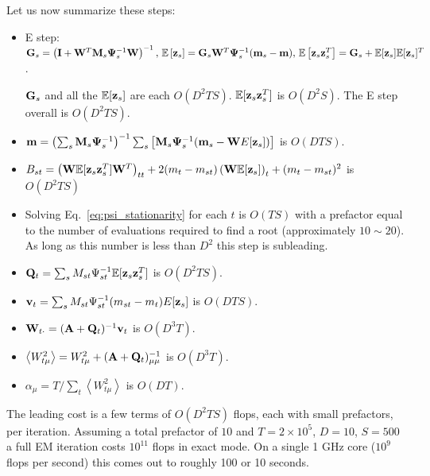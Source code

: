 \documentclass[nofootinbib,amssymb,amsmath]{revtex4}
\newcommand{\ave}[1]{\left\langle #1 \right\rangle}
\newcommand{\vI}{{\bf I}}
\newcommand{\vv}{{\bf v}}
\newcommand{\vz}{{\bf z}}
\newcommand{\vm}{{\bf m}}
\newcommand{\vG}{{\bf G}}
\newcommand{\vQ}{{\bf Q}}
\newcommand{\vM}{{\bf M}}
\newcommand{\vW}{{\bf W}}
\newcommand{\vPsi}{{\bf \Psi}}
\newcommand{\vA}{{\bf A}}
\newcommand{\EE}{\mathbb{E}}
\begin{document}
\noindent Let us now summarize these steps:
\begin{itemize}
\item E step: $\vG_s = \left( \vI + \vW^T \vM_s \vPsi_s^{-1} \vW \right)^{-1}, \,
\EE \left[ \vz_s \right] = \vG_s \vW^T \vPsi_s^{-1} (\vm_s - \vm), \,
\EE \left[ \vz_s \vz_s^T \right] = \vG_s + \EE[\vz_s] \EE[\vz_s]^T$.

$\vG_s$ and all the $\EE[\vz_s]$ are each $O(D^2 T S)$. $\EE[\vz_s \vz_s^T]$ is $O(D^2 S)$.  The E step overall is $O(D^2 T S)$.

\item $\vm = \left( \sum_s \vM_s \vPsi_{s}^{-1} \right)^{-1} \sum_s \left[ \vM_s \vPsi_{s}^{-1}  (\vm_{s}  - \vW  E[\vz_{s}] ) \right]$ is $O(D T S)$.

\item  $ B_{st} =\left( \vW \EE[\vz_s \vz_s^T] \vW^T \right)_{tt} +2 (m_t - m_{st}) \left( \vW \EE[\vz_s] \right)_t + (m_t - m_{st})^2$ is $O(D^2 T S)$

\item Solving Eq.~\eqref{eq:psi_stationarity} for each $t$ is $O(T S)$ with a prefactor equal to the number of evaluations required to find a root (approximately $10 \sim 20$). As long as this number is less than $D^2$ this step is subleading.

\item $\vQ_t = \sum_s M_{st} \Psi_{st}^{-1} \EE[\vz_s \vz_s^T]$ is $O(D^2 T S)$.

\item $\vv_t = \sum_s M_{st} \Psi_{st}^{-1} (m_{st} - m_t)E[\vz_s ]$ is $O(D T S)$.

\item $ \vW_{t \cdot} = (\vA + \vQ_t)^{-1} \vv_t$ is $O(D^3 T)$.

\item $\ave{W_{t\mu}^2} = W_{t\mu}^2 + (\vA + \vQ_t)^{-1}_{\mu\mu}$ is $O(D^3 T)$.

\item $\alpha_\mu = T / \sum_t \ave{W_{t\mu}^2}$ is $O(D T)$.

\end{itemize}

The leading cost is a few terms of $O(D^2 T S)$ flops, each with small prefactors, per iteration. Assuming a total prefactor of $10$ and $T = 2 \times 10^5$, $D = 10$, $S = 500$ a full EM iteration costs $10^{11}$ flops in exact mode. On a single 1 GHz core ($10^9$ flops per second) this comes out to roughly 100 or 10 seconds.\\
\end{document}
